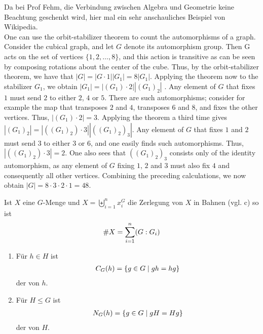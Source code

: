 \begin{*example}
	Da bei Prof Fehm, die Verbindung zwischen Algebra und Geometrie keine Beachtung geschenkt wird, hier mal ein sehr anschauliches Beispiel von Wikipedia.\\
	One can use the orbit-stabilizer theorem  to count the automorphisms of a graph. Consider the cubical graph, and let $G$ denote its automorphism group. Then G acts on the set of vertices $\{1,2,\dots,8\}$, and this action is transitive as can be seen by composing rotations about the center of the cube. Thus, by the orbit-stabilizer theorem, we have that $|G|=|G\cdot 1||G_{1}|=8|G_{1}|$. Applying the theorem now to the stabilizer $G_{1}$, we obtain $|G_{1}|=|(G_{1})\cdot 2||(G_{1})_{2}|$ . Any element of $G$ that fixes $1$ must send $2$ to either $2$, $4$ or $5$. There are such automorphisms; consider for example the map that transposes $2$ and $4$, transposes $6$ and $8$, and fixes the other vertices. Thus, $\left|(G_{1})\cdot 2\right|=3$. Applying the theorem a third time gives $|(G_{1})_{2}|=|((G_{1})_{2})\cdot 3||((G_{1})_{2})_{3}|$. Any element of $G$ that fixes $1$ and $2$ must send $3$ to either $3$ or $6$, and one easily finds such automorphisms. Thus, $\left|((G_{1})_{2})\cdot 3\right|=2$. One also sees that $((G_{1})_{2})_{3}$ consists only of the identity automorphism, as any element of $G$ fixing $1$, $2$ and $3$ must also fix $4$ and consequently all other vertices. Combining the preceding calculations, we now obtain $|G|=8\cdot 3\cdot 2\cdot 1=48$. 
\end{*example}

\begin{conclusion}[Bahngleichung]
	Ist $X$ eine $G$-Menge und $X=\biguplus_{i=1}^n x_i^G$ die Zerlegung von $X$ in Bahnen (vgl.  c) so ist
	\begin{align}
		\# X= \sum_{i=1}^{n} (G:G_i)\notag
	\end{align}
\end{conclusion}

\begin{definition}
	\begin{enumerate}[label=(\alph*)]
		\item Für $h\in H$ ist 
		\begin{align}
			C_G(h) = \{g\in G\mid gh=hg\}\notag
		\end{align}
		der  von $h$.
		\item Für $H\le G$ ist 
		\begin{align}
		N_G(h) = \{g\in G\mid gH=Hg\}\notag
		\end{align}
		der  von $H$.
	\end{enumerate}
\end{definition}

